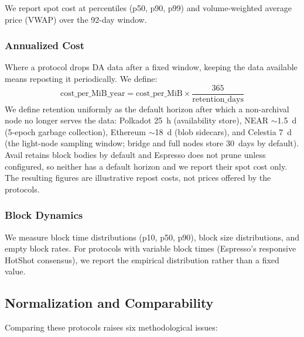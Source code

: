 We report spot cost at percentiles (p50, p90, p99) and volume-weighted average price (VWAP) over the 92-day window.

\subsubsection{Annualized Cost}

Where a protocol drops DA data after a fixed window, keeping the data available means reposting it periodically.
We define:
\begin{equation}
    \text{cost\_per\_MiB\_year} = \text{cost\_per\_MiB} \times \frac{365}{\text{retention\_days}}
\end{equation}
We define retention uniformly as the default horizon after which a non-archival node no longer serves the data: Polkadot 25~h (availability store), NEAR $\sim$1.5~d (5-epoch garbage collection), Ethereum $\sim$18~d (blob sidecars), and Celestia 7~d (the light-node sampling window; bridge and full nodes store 30~days by default). Avail retains block bodies by default and Espresso does not prune unless configured, so neither has a default horizon and we report their spot cost only. The resulting figures are illustrative repost costs, not prices offered by the protocols.

\subsubsection{Block Dynamics}

We measure block time distributions (p10, p50, p90), block size distributions, and empty block rates.
For protocols with variable block times (Espresso's responsive HotShot consensus), we report the empirical distribution rather than a fixed value.

\subsection{Normalization and Comparability}
\label{sec:meth-normalization}

Comparing these protocols raises six methodological issues:

